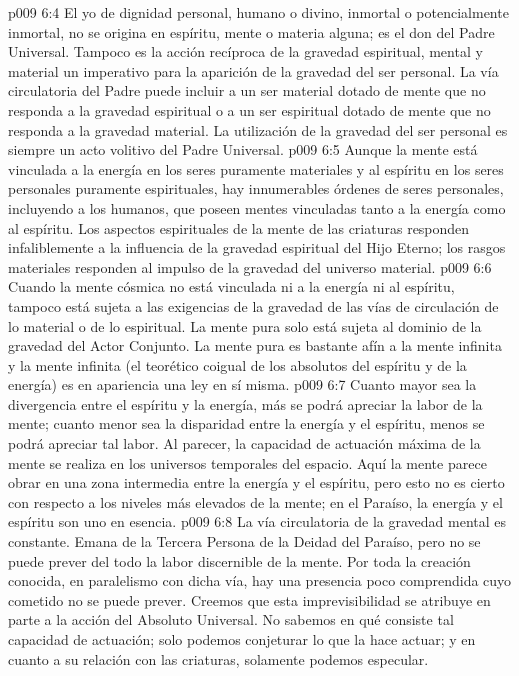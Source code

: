 \vs p009 6:4 \pc El yo de dignidad personal, humano o divino, inmortal o potencialmente inmortal, no se origina en espíritu, mente o materia alguna; es el don del Padre Universal. Tampoco es la acción recíproca de la gravedad espiritual, mental y material un imperativo para la aparición de la gravedad del ser personal. La vía circulatoria del Padre puede incluir a un ser material dotado de mente que no responda a la gravedad espiritual o a un ser espiritual dotado de mente que no responda a la gravedad material. La utilización de la gravedad del ser personal es siempre un acto volitivo del Padre Universal.
\vs p009 6:5 Aunque la mente está vinculada a la energía en los seres puramente materiales y al espíritu en los seres personales puramente espirituales, hay innumerables órdenes de seres personales, incluyendo a los humanos, que poseen mentes vinculadas tanto a la energía como al espíritu. Los aspectos espirituales de la mente de las criaturas responden infaliblemente a la influencia de la gravedad espiritual del Hijo Eterno; los rasgos materiales responden al impulso de la gravedad del universo material.
\vs p009 6:6 \pc Cuando la mente cósmica no está vinculada ni a la energía ni al espíritu, tampoco está sujeta a las exigencias de la gravedad de las vías de circulación de lo material o de lo espiritual. La mente pura solo está sujeta al dominio de la gravedad del Actor Conjunto. La mente pura es bastante afín a la mente infinita y la mente infinita (el teorético coigual de los absolutos del espíritu y de la energía) es en apariencia una ley en sí misma.
\vs p009 6:7 Cuanto mayor sea la divergencia entre el espíritu y la energía, más se podrá apreciar la labor de la mente; cuanto menor sea la disparidad entre la energía y el espíritu, menos se podrá apreciar tal labor. Al parecer, la capacidad de actuación máxima de la mente se realiza en los universos temporales del espacio. Aquí la mente parece obrar en una zona intermedia entre la energía y el espíritu, pero esto no es cierto con respecto a los niveles más elevados de la mente; en el Paraíso, la energía y el espíritu son uno en esencia.
\vs p009 6:8 \pc La vía circulatoria de la gravedad mental es constante. Emana de la Tercera Persona de la Deidad del Paraíso, pero no se puede prever del todo la labor discernible de la mente. Por toda la creación conocida, en paralelismo con dicha vía, hay una presencia poco comprendida cuyo cometido no se puede prever. Creemos que esta imprevisibilidad se atribuye en parte a la acción del Absoluto Universal. No sabemos en qué consiste tal capacidad de actuación; solo podemos conjeturar lo que la hace actuar; y en cuanto a su relación con las criaturas, solamente podemos especular.
